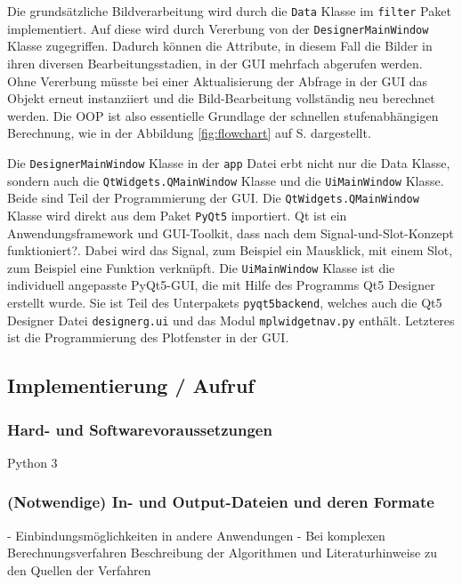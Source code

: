 Die grundsätzliche Bildverarbeitung wird durch die \texttt{Data} Klasse im \texttt{filter} Paket implementiert. Auf diese wird durch Vererbung von der \texttt{DesignerMainWindow} Klasse zugegriffen. Dadurch können die Attribute, in diesem Fall die Bilder in ihren diversen Bearbeitungsstadien, in der GUI mehrfach abgerufen werden. Ohne Vererbung müsste bei einer Aktualisierung der Abfrage in der GUI das Objekt erneut instanziiert und die Bild-Bearbeitung vollständig neu berechnet werden. Die OOP ist also essentielle Grundlage der schnellen stufenabhängigen Berechnung, wie in der Abbildung \ref{fig:flowchart} auf S. \pageref{fig:flowchart} dargestellt. 

Die \texttt{DesignerMainWindow} Klasse in der \texttt{app} Datei erbt nicht nur die Data Klasse, sondern auch die \texttt{QtWidgets.QMainWindow} Klasse und die \texttt{Ui\textunderscore MainWindow} Klasse. Beide sind Teil der Programmierung der GUI. Die \texttt{QtWidgets.QMainWindow} Klasse wird direkt aus dem Paket \texttt{PyQt5} importiert. Qt ist ein Anwendungsframework und GUI-Toolkit, dass nach dem Signal-und-Slot-Konzept funktioniert?. Dabei wird das Signal, zum Beispiel ein Mausklick, mit einem Slot, zum Beispiel eine Funktion verknüpft. Die \texttt{Ui\textunderscore MainWindow} Klasse ist die individuell angepasste PyQt5-GUI, die mit Hilfe des Programms Qt5 Designer erstellt wurde. Sie ist Teil des Unterpakets \texttt{pyqt5backend}, welches auch die Qt5 Designer Datei \texttt{designerg.ui} und das Modul \texttt{mplwidget\textunderscore nav.py} enthält. Letzteres ist die Programmierung des Plotfenster in der GUI.

\subsection{Implementierung / Aufruf}    





\subsubsection{Hard- und Softwarevoraussetzungen}

Python 3 

\subsubsection{(Notwendige) In- und Output-Dateien und deren Formate}


- Einbindungsmöglichkeiten in andere Anwendungen
- Bei komplexen Berechnungsverfahren Beschreibung der Algorithmen und Literaturhinweise zu den Quellen der Verfahren


    
